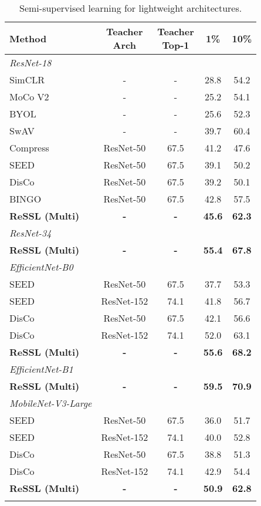 \documentclass{article}
\newcommand{\<}{\left\langle}
\renewcommand{\>}{\right\rangle}
\begin{document}
\renewcommand\arraystretch{1.0}
\begin{table}[h]
 \setlength\tabcolsep{5pt}
 \centering
 \caption{Semi-supervised learning for lightweight architectures.}
 \label{table:lightweit_semi}
 \vspace{-10pt}
\begin{tabular}{l c c c c }
\toprule 
Method &  \makecell{Teacher\\Arch}  & \makecell{Teacher\\Top-1}  &  1\% & 10\% \\ \hline
\emph{ResNet-18} \\
SimCLR \cite{simclr} & - & - & 28.8 & 54.2 \\
MoCo V2 \cite{mocov2} & - & - & 25.2 & 54.1 \\
BYOL \cite{byol} & - & - & 25.6 & 52.3 \\
SwAV \cite{swav} & - & - & 39.7 & 60.4 \\
Compress \cite{compress} & ResNet-50 & 67.5 & 41.2 & 47.6 \\
SEED \cite{seed} & ResNet-50 & 67.5 & 39.1 & 50.2 \\
DisCo \cite{disco} & ResNet-50 & 67.5 & 39.2 & 50.1 \\
BINGO \cite{disco} & ResNet-50 & 67.5 & 42.8 & 57.5 \\
\textbf{ReSSL (Multi)}   & \textbf{-} & \textbf{-} & \textbf{45.6} & \textbf{62.3} \\ \bottomrule
\emph{ResNet-34} \\
\textbf{ReSSL (Multi)}   & \textbf{-} & \textbf{-} & \textbf{55.4} & \textbf{67.8} \\ \bottomrule
\emph{EfficientNet-B0} \\
SEED \cite{seed} & ResNet-50 & 67.5 & 37.7 & 53.3 \\
SEED \cite{seed} & ResNet-152 & 74.1 & 41.8 & 56.7 \\
DisCo \cite{disco} & ResNet-50 & 67.5 & 42.1 & 56.6 \\
DisCo \cite{disco} & ResNet-152 & 74.1 & 52.0 & 63.1 \\
\textbf{ReSSL (Multi)}   & \textbf{-} & \textbf{-} & \textbf{55.6} & \textbf{68.2} \\ 
\bottomrule
\emph{EfficientNet-B1} \\
\textbf{ReSSL (Multi)}   & \textbf{-} & \textbf{-} & \textbf{59.5} & \textbf{70.9} \\ \bottomrule
\emph{MobileNet-V3-Large} \\
SEED \cite{seed} & ResNet-50 & 67.5 & 36.0 & 51.7 \\
SEED \cite{seed} & ResNet-152 & 74.1 & 40.0 & 52.8 \\
DisCo \cite{disco} & ResNet-50 & 67.5 & 38.8 & 51.3 \\
DisCo \cite{disco} & ResNet-152 & 74.1 & 42.9 & 54.4 \\
\textbf{ReSSL (Multi)}   & \textbf{-} & \textbf{-} & \textbf{50.9} & \textbf{62.8} \\ 
\bottomrule
\vspace{-10pt}
\end{tabular}
\end{table}
\end{document}
